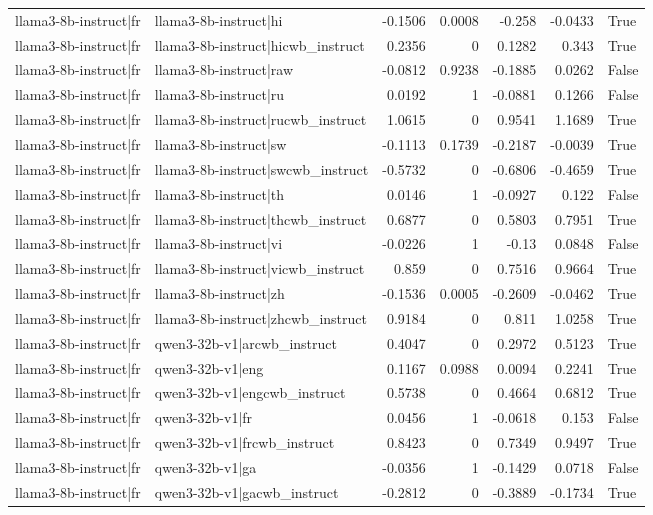 \begin{table}
\begin{tabular}{l l r r r r l}
llama3-8b-instruct|fr & llama3-8b-instruct|hi & -0.1506 & 0.0008 & -0.258 & -0.0433 & True \\
llama3-8b-instruct|fr & llama3-8b-instruct|hicwb_instruct & 0.2356 & 0 & 0.1282 & 0.343 & True \\
llama3-8b-instruct|fr & llama3-8b-instruct|raw & -0.0812 & 0.9238 & -0.1885 & 0.0262 & False \\
llama3-8b-instruct|fr & llama3-8b-instruct|ru & 0.0192 & 1 & -0.0881 & 0.1266 & False \\
llama3-8b-instruct|fr & llama3-8b-instruct|rucwb_instruct & 1.0615 & 0 & 0.9541 & 1.1689 & True \\
llama3-8b-instruct|fr & llama3-8b-instruct|sw & -0.1113 & 0.1739 & -0.2187 & -0.0039 & True \\
llama3-8b-instruct|fr & llama3-8b-instruct|swcwb_instruct & -0.5732 & 0 & -0.6806 & -0.4659 & True \\
llama3-8b-instruct|fr & llama3-8b-instruct|th & 0.0146 & 1 & -0.0927 & 0.122 & False \\
llama3-8b-instruct|fr & llama3-8b-instruct|thcwb_instruct & 0.6877 & 0 & 0.5803 & 0.7951 & True \\
llama3-8b-instruct|fr & llama3-8b-instruct|vi & -0.0226 & 1 & -0.13 & 0.0848 & False \\
llama3-8b-instruct|fr & llama3-8b-instruct|vicwb_instruct & 0.859 & 0 & 0.7516 & 0.9664 & True \\
llama3-8b-instruct|fr & llama3-8b-instruct|zh & -0.1536 & 0.0005 & -0.2609 & -0.0462 & True \\
llama3-8b-instruct|fr & llama3-8b-instruct|zhcwb_instruct & 0.9184 & 0 & 0.811 & 1.0258 & True \\
llama3-8b-instruct|fr & qwen3-32b-v1|arcwb_instruct & 0.4047 & 0 & 0.2972 & 0.5123 & True \\
llama3-8b-instruct|fr & qwen3-32b-v1|eng & 0.1167 & 0.0988 & 0.0094 & 0.2241 & True \\
llama3-8b-instruct|fr & qwen3-32b-v1|engcwb_instruct & 0.5738 & 0 & 0.4664 & 0.6812 & True \\
llama3-8b-instruct|fr & qwen3-32b-v1|fr & 0.0456 & 1 & -0.0618 & 0.153 & False \\
llama3-8b-instruct|fr & qwen3-32b-v1|frcwb_instruct & 0.8423 & 0 & 0.7349 & 0.9497 & True \\
llama3-8b-instruct|fr & qwen3-32b-v1|ga & -0.0356 & 1 & -0.1429 & 0.0718 & False \\
llama3-8b-instruct|fr & qwen3-32b-v1|gacwb_instruct & -0.2812 & 0 & -0.3889 & -0.1734 & True \\

\end{tabular}
\end{table}
